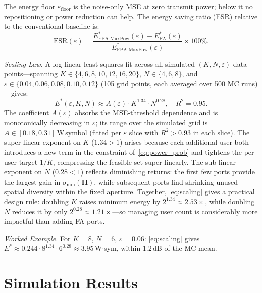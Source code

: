 \documentclass[journal,letterpaper,10pt,twocolumn]{IEEEtran}
\begin{document}
The energy floor $\varepsilon_{\text{floor}}$ is the noise-only MSE at
zero transmit power; below it no repositioning or power reduction can
help. The energy saving ratio (ESR) relative to the conventional
baseline is:
\begin{equation}
  \text{ESR}(\varepsilon) =
  \frac{E^{*}_{\text{FPA-MaxPow}}(\varepsilon)-E^{*}_{\text{FA}}(\varepsilon)}
       {E^{*}_{\text{FPA-MaxPow}}(\varepsilon)}\times 100\%.
  \label{eq:esr}
\end{equation}

\textit{Scaling Law.} A log-linear least-squares fit across all
simulated $(K,N,\varepsilon)$ data points---spanning $K\!\in\!\{4,6,8,10,12,16,20\}$,
$N\!\in\!\{4,6,8\}$, and $\varepsilon\!\in\!\{0.04,0.06,0.08,0.10,0.12\}$
(105 grid points, each averaged over 500 MC runs)---gives:
\begin{equation}
  E^{*}(\varepsilon,K,N)\approx A(\varepsilon)\cdot K^{1.34}\cdot N^{0.28},
  \quad R^{2}=0.95.
  \label{eq:scaling}
\end{equation}
The coefficient $A(\varepsilon)$ absorbs the MSE-threshold dependence
and is monotonically decreasing in $\varepsilon$; its range over the
simulated grid is $A\!\in\![0.18,0.31]$\,W\,symbol (fitted per
$\varepsilon$ slice with $R^{2}\!>\!0.93$ in each slice). The
super-linear exponent on $K$ ($1.34\!>\!1$) arises because each
additional user both introduces a new term in the constraint
of~\eqref{eq:power_prob} and tightens the per-user target $1/K$,
compressing the feasible set super-linearly. The sub-linear exponent on
$N$ ($0.28\!<\!1$) reflects diminishing returns: the first few ports
provide the largest gain in $\sigma_{\min}(\mathbf{H})$, while
subsequent ports find shrinking unused spatial diversity within the
fixed aperture. Together, \eqref{eq:scaling} gives a practical design
rule: doubling $K$ raises minimum energy by $2^{1.34}\approx 2.53\times$,
while doubling $N$ reduces it by only $2^{0.28}\approx 1.21\times$---so
managing user count is considerably more impactful than adding FA ports.

\textit{Worked Example.} For $K\!=\!8$, $N\!=\!6$,
$\varepsilon\!=\!0.06$: \eqref{eq:scaling} gives
$E^{*}\approx 0.244\cdot 8^{1.34}\cdot 6^{0.28}\approx 3.95$\,W$\cdot$sym,
within 1.2\,dB of the MC mean.

\section{Simulation Results}
\end{document}
